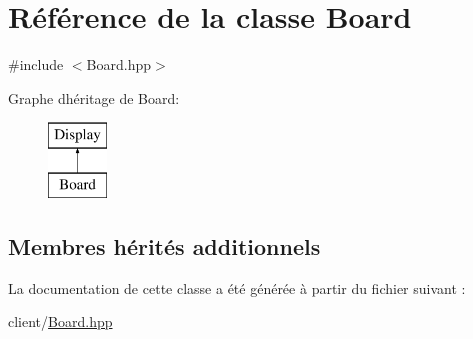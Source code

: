 \hypertarget{classBoard}{}\section{Référence de la classe Board}
\label{classBoard}


{\ttfamily \#include $<$Board.\+hpp$>$}

Graphe d\textquotesingle{}héritage de Board\+:\begin{figure}[H]
\begin{center}
\leavevmode
\includegraphics[height=2.000000cm]{classBoard}
\end{center}
\end{figure}
\subsection*{Membres hérités additionnels}


La documentation de cette classe a été générée à partir du fichier suivant \+:\begin{DoxyCompactItemize}
\item 
client/\hyperlink{Board_8hpp}{Board.\+hpp}\end{DoxyCompactItemize}

